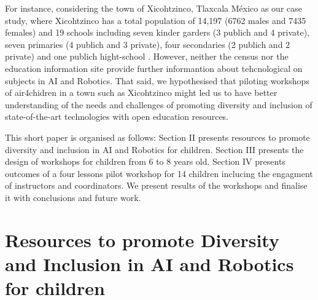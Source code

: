 \documentclass[conference]{IEEEtran}
\begin{document}
For instance, considering the town of Xicohtzinco, Tlaxcala M\'exico as our case study, where Xicohtzinco has a total population of 14,197 (6762 males and 7435 females) \cite{inegi2022} and 19 schools including seven kinder garders (3 publich and 4 private), seven primaries (4 publich and 3 private), four secondaries (2 publich and 2 private) and one publich hight-school \cite{siged2022}.
However, neither the census \cite{inegi2022} nor the education information site \cite{siged2022} provide further informantion about tehcnological on subjects in AI and Robotics.
That said, we hypothesised that piloting workshops of air4chidren in a town such as Xicohtzinco might led us to have better understanding of the needs and challenges of promoting diversity and inclusion of state-of-the-art technologies with open education resources.

This short paper is organised as follows:
Section II presents resources to promote diversity and inclusion in AI and Robotics for children.
Section III presents the design of workshops for children from 6 to 8 years old.
Section IV presents outcomes of a four lessons pilot workshop for 14 children inclucing the engagment of instructors and coordinators. 
We present results of the workshops and finalise it with conclusions and future work.


\section{Resources to promote Diversity and Inclusion in AI and Robotics for children}
\end{document}
